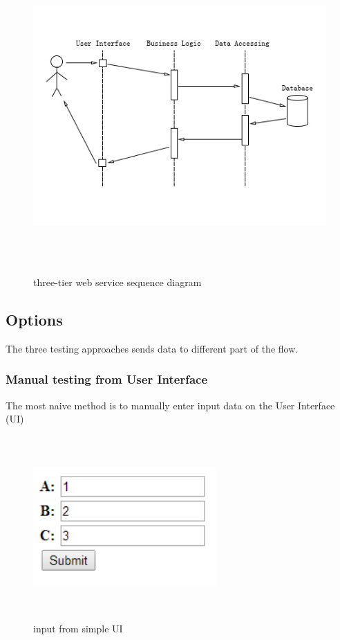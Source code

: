 \documentclass[12pt]{article}
\begin{document}
\begin{figure}[ht!]
\centering
\includegraphics[width=12cm,height=12cm,keepaspectratio]{img/three_tier.jpg}
\caption{three-tier web service sequence diagram}
\label{overflow}
\end{figure}

\subsection{Options}
The three testing approaches sends data to different part of the flow.\\
\subsubsection{Manual testing from User Interface}
The most naive method is to manually enter input data on the User Interface (UI) \\
		
\begin{figure}[ht!]
\centering
\includegraphics[width=7cm,height=7cm,keepaspectratio]{img/ui.jpg}
\caption{input from simple UI}
\label{overflow}
\end{figure}
\end{document}
